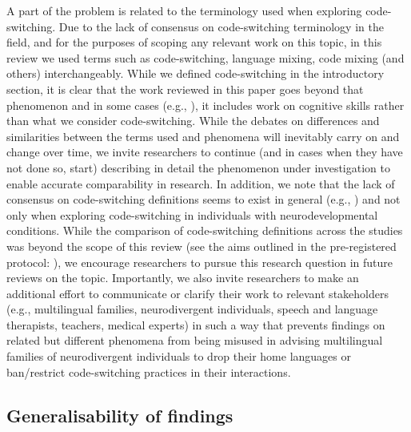 \documentclass[output=paper]{langscibook}
\begin{document}
A part of the problem is related to the terminology used when exploring code-switching. Due to the lack of consensus on code-switching terminology in the field, and for the purposes of scoping any relevant work on this topic, in this review we used terms such as code-switching, language mixing, code mixing (and others) interchangeably. While we defined code-switching in the introductory section, it is clear that the work reviewed in this paper goes beyond that phenomenon and in some cases (e.g., \citealt{SnijdersEtAl2025}), it includes work on cognitive skills rather than what we consider code-switching. While the debates on differences and similarities between the terms used and phenomena will inevitably carry on and change over time, we invite researchers to continue (and in cases when they have not done so, start) describing in detail the phenomenon under investigation to enable accurate comparability in research. In addition, we note that the lack of consensus on code-switching definitions seems to exist in general (e.g., \citealt{GullbergEtAl2009}) and not only when exploring code-switching in individuals with neurodevelopmental conditions. While the comparison of code-switching definitions across the studies was beyond the scope of this review (see the aims outlined in the pre-registered protocol: \citealt{KascelanParafitaCouto2022}), we encourage researchers to pursue this research question in future reviews on the topic. Importantly, we also invite researchers to make an additional effort to communicate or clarify their work to relevant stakeholders (e.g., multilingual families, neurodivergent individuals, speech and language therapists, teachers, medical experts) in such a way that prevents findings on related but different phenomena from being misused in advising multilingual families of neurodivergent individuals to drop their home languages or ban/restrict code-switching practices in their interactions.

\subsection{Generalisability of findings}
\end{document}
